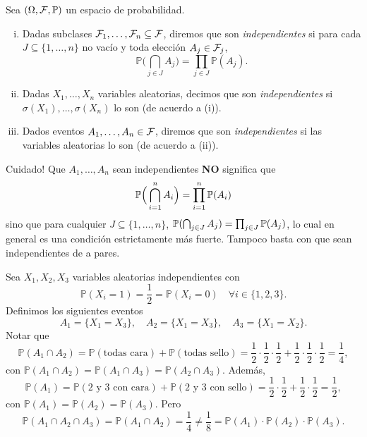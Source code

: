 \begin{definition}
	Sea $(\Omega, \mathcal{F}, \mathbb{P})$ un espacio de probabilidad.
	\begin{enumerate}[i)]
		\item Dadas subclases $\mathcal{F}_{1},\dots, \mathcal{F}_{n} \subseteq \mathcal{F}$, diremos que son \textit{independientes} si para cada $J \subseteq \{1, \dots, n\}$ no vacío y toda elección $A_{j} \in \mathcal{F}_{j}$,
		\[ \mathbb{P}\Big( \bigcap_{j \in J} A_{j} \Big) = \prod_{j \in J} \mathbb{P}(A_{j}). \]

		\item Dadas $X_{1},\dots, X_{n}$ variables aleatorias, decimos que son \textit{independientes} si $\sigma(X_{1}), \dots, \sigma(X_{n})$ lo son (de acuerdo a (i)).

		\item Dados eventos $A_{1}, \dots, A_{n} \in \mathcal{F}$, diremos que son \textit{independientes} si las variables aleatorias lo son (de acuerdo a (ii)).
	\end{enumerate}
\end{definition}

\begin{note}
	Cuidado! Que $A_{1}, \dots, A_{n}$ sean independientes \textbf{NO} significa que
	\[ \mathbb{P}\Big( \bigcap_{i=1}^{n} A_{i} \Big) = \prod_{i=1}^{n} \mathbb{P}(A_{i}) \]
	sino que para cualquier $J \subseteq \{1, \dots, n\}$, $\mathbb{P}(\bigcap_{j \in J} A_{j}) = \prod_{j \in J} \mathbb{P}(A_{j})$, lo cual en general es una condición estrictamente más fuerte. Tampoco basta con que sean independientes de a pares.
\end{note}

\begin{eg}
	Sea $X_{1}, X_{2}, X_{3}$ variables aleatorias independientes con
	\[ \mathbb{P}(X_{i} = 1) = \frac{1}{2} = \mathbb{P}(X_{i} = 0) \quad \forall i \in \{1,2,3\}. \] 
	Definimos los siguientes eventos
	\[ A_{1} = \{X_{1} = X_{3}\}, \quad A_{2} = \{X_{1} = X_{3}\}, \quad A_{3} = \{X_{1} = X_{2}\}. \]
	Notar que
	\[ \mathbb{P}(A_{1} \cap A_{2}) = \mathbb{P}(\text{todas cara}) + \mathbb{P}(\text{todas sello}) = \frac{1}{2} \cdot \frac{1}{2} \cdot \frac{1}{2} + \frac{1}{2} \cdot \frac{1}{2} \cdot \frac{1}{2} = \frac{1}{4}, \]
	con $\mathbb{P}(A_{1} \cap A_{2}) = \mathbb{P}(A_{1} \cap A_{3}) = \mathbb{P}(A_{2} \cap A_{3})$. Además,
	\[ \mathbb{P}(A_{1}) = \mathbb{P}(\text{2 y 3 con cara}) + \mathbb{P}(\text{2 y 3 con sello}) = \frac{1}{2} \cdot \frac{1}{2} + \frac{1}{2} \cdot \frac{1}{2} = \frac{1}{2}, \]
	con $\mathbb{P}(A_{1}) = \mathbb{P}(A_{2}) = \mathbb{P}(A_{3})$.
	Pero
	\[ \mathbb{P}(A_{1} \cap A_{2} \cap A_{3}) = \mathbb{P}(A_{1} \cap A_{2}) = \frac{1}{4} \neq \frac{1}{8} = \mathbb{P}(A_{1}) \cdot \mathbb{P}(A_{2}) \cdot \mathbb{P}(A_{3}). \]
\end{eg}
